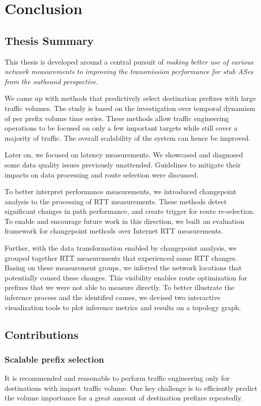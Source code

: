 \chapter{Conclusion}

\section{Thesis Summary}

This thesis is developed around a central pursuit of \textit{making better use of various network measurements to improving the transmission performance for stub ASes from the outbound perspective.}

We came up with methods that predictively select destination prefixes with large traffic volumes.
The study is based on the investigation over temporal dynamism of per prefix volume time series.
These methods allow traffic engineering operations to be focused on only a few important targets while still cover a majority of traffic.
The overall scalability of the system can hence be improved.

Later on, we focused on latency measurements. 
We showcased and diagnosed some data quality issues previously unattended.
Guidelines to mitigate their impacts on data processing and route selection were discussed.

To better interpret performance measurements, we introduced changepoint analysis to the processing of RTT measurements.
These methods detect significant changes in path performance, and create trigger for route re-selection.
To enable and encourage future work in this direction, we built an evaluation framework for changepoint methods over Internet RTT measurements.

Further, with the data transformation enabled by changepoint analysis, we grouped together RTT measurements that experienced same RTT changes.
Basing on these measurement groups, we inferred the network locations that potentially caused these changes. 
This visibility enables route optimization for prefixes that we were not able to measure directly.
To better illustrate the inference process and the identified causes, we devised two interactive visualization tools to plot inference metrics and results on a topology graph.

\section{Contributions}

\subsection{Scalable prefix selection}
It is recommended and reasonable to perform traffic engineering only for destinations with import traffic volume. One key challenge is to efficiently predict the volume importance for a great amount of destination prefixes repeatedly.

